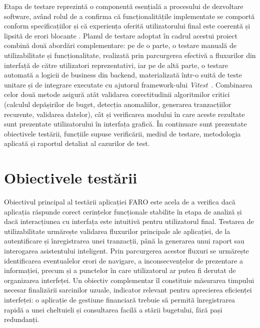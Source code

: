 \documentclass[12pt,a4paper,oneside]{report}
\begin{document}
Etapa de testare reprezintă o componentă esențială a procesului de dezvoltare software, având rolul de a confirma că funcționalitățile implementate se comportă conform specificațiilor și că experiența oferită utilizatorului final este coerentă și lipsită de erori blocante \cite{ref:testing}. Planul de testare adoptat în cadrul acestui proiect combină două abordări complementare: pe de o parte, o testare manuală de utilizabilitate și funcționalitate, realizată prin parcurgerea efectivă a fluxurilor din interfață de către utilizatori reprezentativi, iar pe de altă parte, o testare automată a logicii de business din backend, materializată într-o suită de teste unitare și de integrare executate cu ajutorul framework-ului \emph{Vitest}~\cite{ref:vitest}. Combinarea celor două metode asigură atât validarea corectitudinii algoritmilor critici (calculul depășirilor de buget, detecția anomaliilor, generarea tranzacțiilor recurente, validarea datelor), cât și verificarea modului în care aceste rezultate sunt prezentate utilizatorului în interfața grafică. În continuare sunt prezentate obiectivele testării, funcțiile supuse verificării, mediul de testare, metodologia aplicată și raportul detaliat al cazurilor de test.

\section{Obiectivele testării}

Obiectivul principal al testării aplicației FARO este acela de a verifica dacă aplicația răspunde corect cerințelor funcționale stabilite în etapa de analiză și dacă interacțiunea cu interfața este intuitivă pentru utilizatorul final. Testarea de utilizabilitate urmărește validarea fluxurilor principale ale aplicației, de la autentificare și înregistrarea unei tranzacții, până la generarea unui raport sau interogarea asistentului inteligent. Prin parcurgerea acestor fluxuri se urmărește identificarea eventualelor erori de navigare, a inconsecvențelor de prezentare a informației, precum și a punctelor în care utilizatorul ar putea fi derutat de organizarea interfeței. Un obiectiv complementar îl constituie măsurarea timpului necesar finalizării sarcinilor uzuale, indicator relevant pentru aprecierea eficienței interfeței: o aplicație de gestiune financiară trebuie să permită înregistrarea rapidă a unei cheltuieli și consultarea facilă a stării bugetului, fără pași redundanți.
\end{document}
